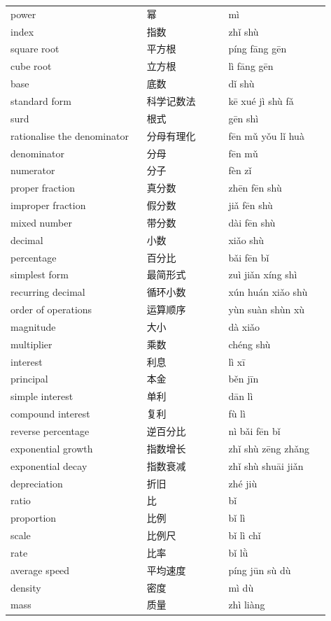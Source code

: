 \documentclass[11pt]{article}
\begin{document}
\begin{longtable}{@{}p{0.40\linewidth}p{0.24\linewidth}p{0.30\linewidth}@{}}
power & 幂 & mì \\
index & 指数 & zhǐ shù \\
square root & 平方根 & píng fāng gēn \\
cube root & 立方根 & lì fāng gēn \\
base & 底数 & dǐ shù \\
standard form & 科学记数法 & kē xué jì shù fǎ \\
surd & 根式 & gēn shì \\
rationalise the denominator & 分母有理化 & fēn mǔ yǒu lǐ huà \\
denominator & 分母 & fēn mǔ \\
numerator & 分子 & fèn zǐ \\
proper fraction & 真分数 & zhēn fēn shù \\
improper fraction & 假分数 & jiǎ fēn shù \\
mixed number & 带分数 & dài fēn shù \\
decimal & 小数 & xiǎo shù \\
percentage & 百分比 & bǎi fēn bǐ \\
simplest form & 最简形式 & zuì jiǎn xíng shì \\
recurring decimal & 循环小数 & xún huán xiǎo shù \\
order of operations & 运算顺序 & yùn suàn shùn xù \\
magnitude & 大小 & dà xiǎo \\
multiplier & 乘数 & chéng shù \\
interest & 利息 & lì xī \\
principal & 本金 & běn jīn \\
simple interest & 单利 & dān lì \\
compound interest & 复利 & fù lì \\
reverse percentage & 逆百分比 & nì bǎi fēn bǐ \\
exponential growth & 指数增长 & zhǐ shù zēng zhǎng \\
exponential decay & 指数衰减 & zhǐ shù shuāi jiǎn \\
depreciation & 折旧 & zhé jiù \\
ratio & 比 & bǐ \\
proportion & 比例 & bǐ lì \\
scale & 比例尺 & bǐ lì chǐ \\
rate & 比率 & bǐ lǜ \\
average speed & 平均速度 & píng jūn sù dù \\
density & 密度 & mì dù \\
mass & 质量 & zhì liàng \\

\end{longtable}
\end{document}
